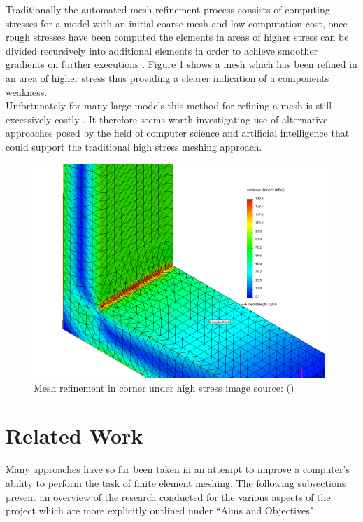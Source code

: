 \documentclass{article}
\begin{document}
\noindent
Traditionally the automated mesh refinement process consists of computing stresses for a model with an initial coarse mesh and low computation cost, once rough stresses have been computed the elements in areas of higher stress can be divided recursively into additional elements in order to achieve smoother gradients on further executions \cite{cite03}. Figure 1 shows a mesh which has been refined in an area of higher stress thus providing a clearer indication of a components weakness. \\ 

\noindent
Unfortunately for many large models this method for refining a mesh is still excessively costly \cite{DolsakPaper91}. It therefore seems worth investigating use of alternative approaches posed by the field of computer science and artificial intelligence that could support the traditional high stress meshing approach. 

\begin{figure}
  \centerline{\includegraphics[width=110mm, scale=0.5]{stressedCorner.png}}
  \caption{Mesh refinement in corner under high stress image source: (\cite{HighStressCorner})}
  \label{fig:boat1}
\end{figure}

\section{Related Work}

Many approaches have so far been taken in an attempt to improve a computer's ability to perform the task of finite element meshing. The following subsections present an overview of the research conducted for the various aspects of the project which are more explicitly outlined under ``Aims and Objectives"
\end{document}
